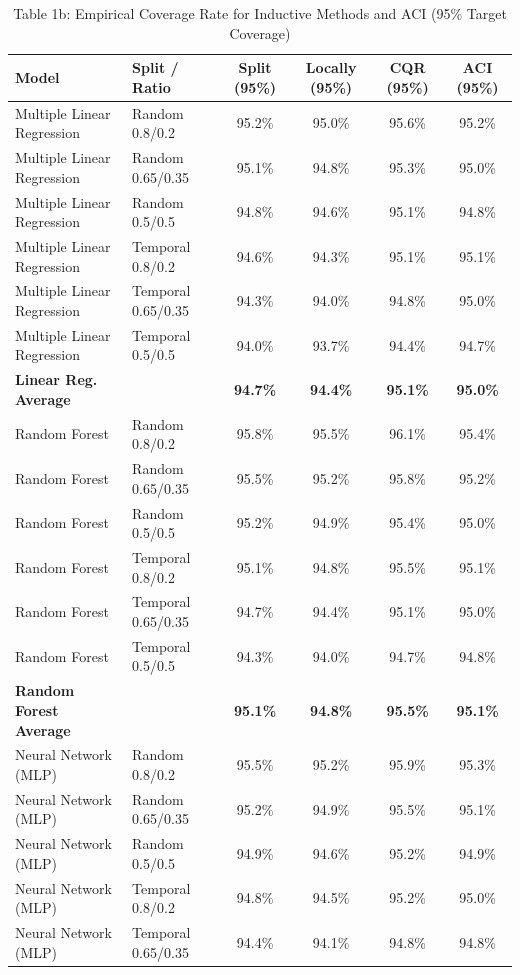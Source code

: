 \documentclass[11pt,a4paper]{article}
\begin{document}
\begin{table}[H]
\centering
\caption{Table 1b: Empirical Coverage Rate for Inductive Methods and ACI (95\% Target Coverage)}
\label{tab:1b}
\scriptsize
\begin{tabular}{llcccc}
\toprule
Model & Split / Ratio & Split (95\%) & Locally (95\%) & CQR (95\%) & ACI (95\%) \\
\midrule
Multiple Linear Regression & Random 0.8/0.2 & 95.2\% & 95.0\% & 95.6\% & 95.2\% \\
Multiple Linear Regression & Random 0.65/0.35 & 95.1\% & 94.8\% & 95.3\% & 95.0\% \\
Multiple Linear Regression & Random 0.5/0.5 & 94.8\% & 94.6\% & 95.1\% & 94.8\% \\
Multiple Linear Regression & Temporal 0.8/0.2 & 94.6\% & 94.3\% & 95.1\% & 95.1\% \\
Multiple Linear Regression & Temporal 0.65/0.35 & 94.3\% & 94.0\% & 94.8\% & 95.0\% \\
Multiple Linear Regression & Temporal 0.5/0.5 & 94.0\% & 93.7\% & 94.4\% & 94.7\% \\
\textbf{Linear Reg. Average} & & \textbf{94.7\%} & \textbf{94.4\%} & \textbf{95.1\%} & \textbf{95.0\%} \\
\midrule
Random Forest & Random 0.8/0.2 & 95.8\% & 95.5\% & 96.1\% & 95.4\% \\
Random Forest & Random 0.65/0.35 & 95.5\% & 95.2\% & 95.8\% & 95.2\% \\
Random Forest & Random 0.5/0.5 & 95.2\% & 94.9\% & 95.4\% & 95.0\% \\
Random Forest & Temporal 0.8/0.2 & 95.1\% & 94.8\% & 95.5\% & 95.1\% \\
Random Forest & Temporal 0.65/0.35 & 94.7\% & 94.4\% & 95.1\% & 95.0\% \\
Random Forest & Temporal 0.5/0.5 & 94.3\% & 94.0\% & 94.7\% & 94.8\% \\
\textbf{Random Forest Average} & & \textbf{95.1\%} & \textbf{94.8\%} & \textbf{95.5\%} & \textbf{95.1\%} \\
\midrule
Neural Network (MLP) & Random 0.8/0.2 & 95.5\% & 95.2\% & 95.9\% & 95.3\% \\
Neural Network (MLP) & Random 0.65/0.35 & 95.2\% & 94.9\% & 95.5\% & 95.1\% \\
Neural Network (MLP) & Random 0.5/0.5 & 94.9\% & 94.6\% & 95.2\% & 94.9\% \\
Neural Network (MLP) & Temporal 0.8/0.2 & 94.8\% & 94.5\% & 95.2\% & 95.0\% \\
Neural Network (MLP) & Temporal 0.65/0.35 & 94.4\% & 94.1\% & 94.8\% & 94.8\% \\

\end{tabular}
\end{table}
\end{document}
